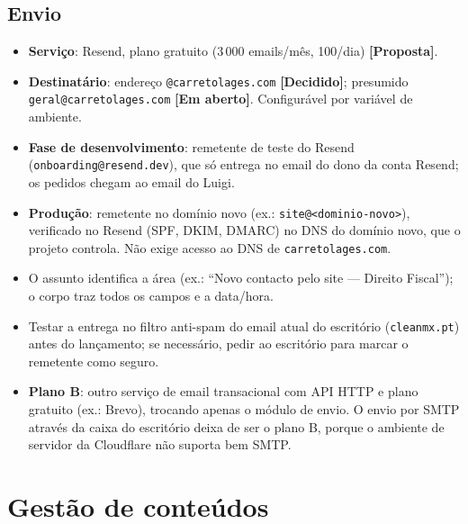 \documentclass[11pt,a4paper]{article}
\newcommand{\decidido}{\textcolor{verde700}{\textbf{[Decidido]}}}
\newcommand{\proposta}{\textcolor{bronze}{\textbf{[Proposta]}}}
\newcommand{\aberto}{\textcolor{red!60!black}{\textbf{[Em aberto]}}}
\begin{document}
\subsection{Envio}
\begin{itemize}
  \item \textbf{Serviço}: Resend, plano gratuito (3\,000 emails/mês, 100/dia) \proposta.
  \item \textbf{Destinatário}: endereço \texttt{@carretolages.com} \decidido; presumido \texttt{geral@carretolages.com} \aberto. Configurável por variável de ambiente.
  \item \textbf{Fase de desenvolvimento}: remetente de teste do Resend (\texttt{onboarding@resend.dev}), que só entrega no email do dono da conta Resend; os pedidos chegam ao email do Luigi.
  \item \textbf{Produção}: remetente no domínio novo (ex.: \texttt{site@<dominio-novo>}), verificado no Resend (SPF, DKIM, DMARC) no DNS do domínio novo, que o projeto controla. Não exige acesso ao DNS de \texttt{carretolages.com}.
  \item O assunto identifica a área (ex.: ``Novo contacto pelo site — Direito Fiscal''); o corpo traz todos os campos e a data/hora.
  \item Testar a entrega no filtro anti-spam do email atual do escritório (\texttt{cleanmx.pt}) antes do lançamento; se necessário, pedir ao escritório para marcar o remetente como seguro.
  \item \textbf{Plano B}: outro serviço de email transacional com API HTTP e plano gratuito (ex.: Brevo), trocando apenas o módulo de envio. O envio por SMTP através da caixa do escritório deixa de ser o plano B, porque o ambiente de servidor da Cloudflare não suporta bem SMTP.
\end{itemize}

\section{Gestão de conteúdos}\label{sec:cms}
\end{document}
